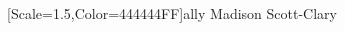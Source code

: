 \documentclass[11pt]{memoir}
\begin{document}
  \frontmatter

  

  \pagestyle{plain}

  \doublespacing

  \null
  \vfill
  \begin{flushright}
    {[Scale=1.5,Color=444444FF]\Huge ally}
    \vfill
    {\Huge Madison Scott-Clary}
  \end{flushright}
  \thispagestyle{empty}

  \newpage

  

  \tableofcontents*
  \newpage
  \null
  \cleardoublepage

  \onehalfspacing


  \mainmatter

  \pagestyle{ourbook}
  \twosided


  \begin{paracol}{2}
  \begin{leftcolumn}
  
  
  
  
  \end{leftcolumn}
  \end{paracol}
  \begin{paracol}{2}
  \begin{leftcolumn}
  
  
  
  
  
  
  
  \end{leftcolumn}
  \end{paracol}

  \begin{paracol}{2}
  \begin{leftcolumn}
  
  \end{leftcolumn}
  \end{paracol}

  \begin{paracol}{2}
  \begin{leftcolumn}
  
  \end{leftcolumn}
  \end{paracol}
\end{document}
